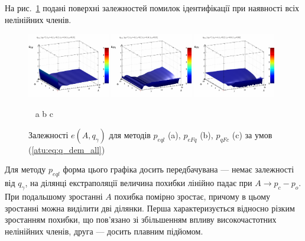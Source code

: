 На рис.~\ref{atu:f:qsl_pe_A_qg_all} подані поверхні залежностей помилок ідентифікації
при наявності всіх нелінійних членів.


\begin{figure}[htb!]
  \begin{center}
    \includegraphics[width=0.32\textwidth]{p/qls_pe-p_A_qg_eql_all.png}
    \hfill
    \includegraphics[width=0.32\textwidth]{p/qls_pe-p_A_qg_eFq_all.png}
    \hfill
    \includegraphics[width=0.32\textwidth]{p/qls_pe-p_A_qg_eFc_all.png}
  \end{center}
  \vspace{-1.0ex}
  \begin{center}
    ~ \hfill a \hfill\hfill b \hfill\hfill c \hfill ~
  \end{center}
  \vspace{-1.5ex}
  \caption{Залежності $e(A,q_\gamma)$ для методів $p_{eql}$ (a), $p_{eFq}$ (b), $p_{qFc}$ (c) за умов (\ref{atu:eq:q_dem_all})}
  \label{atu:f:qsl_pe_A_qg_all}
\end{figure}

Для методу $p_{eql}$ форма цього графіка досить передбачувана --- немає
залежності від $q_\gamma$, на ділянці екстраполяції величина похибки
лінійно падає при $A \to p_c - p_o$. При подальшому зростанні $A$ похибка
помірно зростає, причому в цьому зростанні можна виділити дві ділянки. Перша
характеризується відносно різким зростанням похибки, що пов'язано зі збільшенням
впливу високочастотних нелінійних членів, друга --- досить плавним підйомом.

